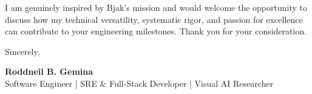 \documentclass[letterpaper,11pt]{article}
\begin{document}
I am genuinely inspired by Bjak's mission and would welcome the opportunity to discuss how my technical versatility, systematic rigor, and passion for excellence can contribute to your engineering milestones. Thank you for your consideration.

Sincerely,

\vspace{12pt}
\textbf{Roddneil B. Gemina} \\
Software Engineer | SRE \& Full-Stack Developer | Visual AI Researcher
\end{document}
